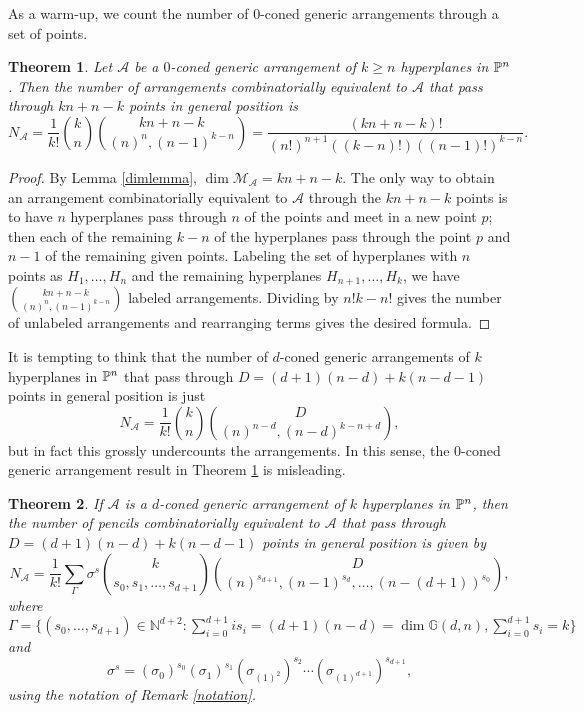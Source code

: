 \documentclass[12pt]{article}
\theoremstyle{plain}
\newtheorem{theorem}{Theorem}
\theoremstyle{definition}
\newcommand{\A}{\mathcal{A}}
\newcommand{\M}{\mathcal{M}}
\newcommand{\N}{N}
\newcommand{\NN}{\mathbb{N}}
\newcommand{\MLA}{\M_{\A}}
\newcommand{\G}{\mathbb{G}}
\renewcommand{\P}{\ensuremath \mathbb{P}}
\begin{document}
As a warm-up, we count the number of $0$-coned generic arrangements through a set of
points. 

\begin{theorem} \label{0pencil}
Let $\A$ be a $0$-coned generic arrangement of $k \geq n$ hyperplanes in $\P^n$. Then the number of arrangements combinatorially
equivalent to $\A$ that pass through $kn+n-k$ points in general
position is $$\N_\A = \frac{1}{k!} \binom{k}{n}
\binom{kn+n-k}{(n)^n,(n-1)^{k-n}}  = \frac{(kn+n-k)!}{(n!)^{n+1}((k-n)!)((n-1)!)^{k-n}}.  $$
\end{theorem}

\begin{proof}
By Lemma \ref{dimlemma}, $\dim \MLA = kn+n-k$. The only way to obtain
an arrangement combinatorially equivalent to $\A$ through the $kn+n-k$
points is to have $n$ hyperplanes pass through $n$ of the points and
meet in a new point $p$; then each of the remaining $k-n$ of the hyperplanes
pass through the point $p$ and $n-1$ of the remaining given points. Labeling the
set of hyperplanes with $n$ points as $H_1, \ldots, H_n$ and the
remaining hyperplanes $H_{n+1},\ldots, H_k$, we have
$\binom{kn+n-k}{(n)^n,(n-1)^{k-n}}$ labeled arrangements. Dividing by
$n! k-n!$ gives the number of unlabeled arrangements and rearranging
terms gives the desired formula. 
\end{proof}

It is tempting to think that the number of $d$-coned generic
arrangements of $k$ hyperplanes in $\P^n$
that pass through $D =
(d+1)(n-d) + k(n-d-1)$ points in general position is just $$\N_\A = \frac{1}{k!} \binom{k}{n}
\binom{D}{(n)^{n-d},(n-d)^{k-n+d}},  $$
but in fact this grossly undercounts the arrangements. In this sense,
the $0$-coned generic arrangement result in Theorem \ref{0pencil} is misleading. 

\begin{theorem} \label{countdpencil} If $\A$ is a $d$-coned generic
  arrangement of $k$ hyperplanes in $\P^n$, then the number of pencils
  combinatorially equivalent to $\A$ that pass through $D=(d+1)(n-d) +
  k(n-d-1)$ points in general position is given by
$$ \N_\A =  \frac{1}{k!} \sum_{\Gamma}
\sigma^{s} \binom{k}{s_0,s_1,\ldots,s_{d+1}}
\binom{D}{(n)^{s_{d+1}},(n-1)^{s_{d}},\ldots,(n-(d+1))^{s_0}}, $$
where $\Gamma = \{(s_0,\ldots,s_{d+1}) \in \NN^{d+2}: \sum_{i=0}^{d+1} is_i =
(d+1)(n-d) = \dim \G(d,n),
  \sum_{i=0}^{d+1} s_i = k\}$ and $$\sigma^{s} = (\sigma_0)^{s_0}
  (\sigma_1)^{s_1} (\sigma_{(1)^2})^{s_2} \cdots
  (\sigma_{(1)^{d+1}})^{s_{d+1}},$$
using the notation of Remark \ref{notation}. 
\end{theorem}
\end{document}
